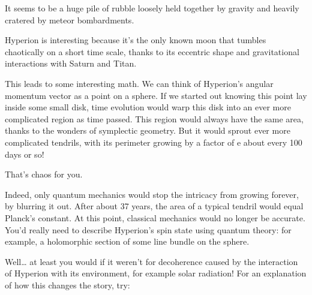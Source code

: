 \documentclass{article}
\def\tightlist{}
\renewcommand{\texttt}[1]{%
  \begingroup
  \ttfamily
  \begingroup\lccode`~=`/\lowercase{\endgroup\def~}{/\discretionary{}{}{}}%
  \begingroup\lccode`~=`[\lowercase{\endgroup\def~}{[\discretionary{}{}{}}%
  \begingroup\lccode`~=`.\lowercase{\endgroup\def~}{.\discretionary{}{}{}}%
  \catcode`/=\active\catcode`[=\active\catcode`.=\active
  \scantokens{#1\noexpand}%
  \endgroup
}
\begin{document}

It seems to be a huge pile of rubble loosely held together by gravity
and heavily cratered by meteor bombardments.

Hyperion is interesting because it's the only known moon that tumbles
chaotically on a short time scale, thanks to its eccentric shape and
gravitational interactions with Saturn and Titan.

This leads to some interesting math. We can think of Hyperion's angular
momentum vector as a point on a sphere. If we started out knowing this
point lay inside some small disk, time evolution would warp this disk
into an ever more complicated region as time passed. This region would
always have the same area, thanks to the wonders of symplectic geometry.
But it would sprout ever more complicated tendrils, with its perimeter
growing by a factor of e about every 100 days or so!

That's chaos for you.

Indeed, only quantum mechanics would stop the intricacy from growing
forever, by blurring it out. After about 37 years, the area of a typical
tendril would equal Planck's constant. At this point, classical
mechanics would no longer be accurate. You'd really need to describe
Hyperion's spin state using quantum theory: for example, a holomorphic
section of some line bundle on the sphere.

Well\ldots{} at least you would if it weren't for decoherence caused by
the interaction of Hyperion with its environment, for example solar
radiation! For an explanation of how this changes the story, try:

\end{document}
